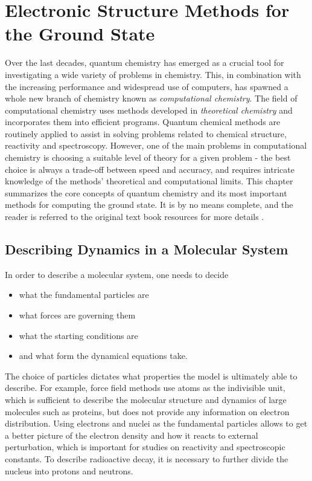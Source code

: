 \chapter{Electronic Structure Methods for the Ground State}

Over the last decades, quantum chemistry has emerged as a crucial tool for investigating a wide variety of problems in chemistry. This, in combination with the increasing performance and widespread use of computers, has spawned a whole new branch of chemistry known as \emph{computational chemistry}. The field of computational chemistry uses methods developed in \emph{theoretical chemistry} and incorporates them into efficient programs. Quantum chemical methods are routinely applied to assist in solving problems related to chemical structure, reactivity and spectroscopy. However, one of the main problems in computational chemistry is choosing a suitable level of theory for a given problem - the best choice is always a trade-off between speed and accuracy, and requires intricate knowledge of the methods' theoretical and computational limits. This chapter summarizes the core concepts of quantum chemistry and its most important methods for computing the ground state. It is by no means complete, and the reader is referred to the original text book resources for more details \cite{Sza1996,Hel2000,Jen2017,Nor2018,Sch2018}.

\section{Describing Dynamics in a Molecular System}

In order to describe a molecular system, one needs to decide
\begin{itemize}
\item what the fundamental particles are
\item what forces are governing them
\item what the starting conditions are
\item and what form the dynamical equations take.
\end{itemize}
\noindent The choice of particles dictates what properties the model is ultimately able to describe. For example, force field methods use atoms as the indivisible unit, which is sufficient to describe the molecular structure and dynamics of large molecules such as proteins, but does not provide any information on electron distribution. Using electrons and nuclei as the fundamental particles allows to get a better picture of the electron density and how it reacts to external perturbation, which is important for studies on reactivity and spectroscopic constants. To describe radioactive decay, it is necessary to further divide the nucleus into protons and neutrons. 

